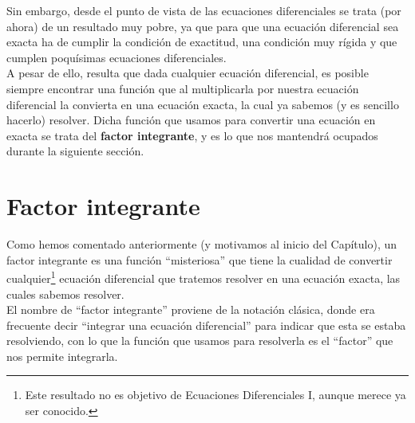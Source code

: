 Sin embargo, desde el punto de vista de las ecuaciones diferenciales se trata (por ahora) de un resultado muy pobre, ya que para que una ecuación diferencial sea exacta ha de cumplir la condición de exactitud, una condición muy rígida y que cumplen poquísimas ecuaciones diferenciales.\\

A pesar de ello, resulta que dada cualquier ecuación diferencial, es posible siempre encontrar una función que al multiplicarla por nuestra ecuación diferencial la convierta en una ecuación exacta, la cual ya sabemos (y es sencillo hacerlo) resolver. Dicha función que usamos para convertir una ecuación en exacta se trata del \textbf{factor integrante}, y es lo que nos mantendrá ocupados durante la siguiente sección.

\section{Factor integrante}
Como hemos comentado anteriormente (y motivamos al inicio del Capítulo), un factor integrante es una función ``misteriosa'' que tiene la cualidad de convertir cualquier\footnote{Este resultado no es objetivo de Ecuaciones Diferenciales I, aunque merece ya ser conocido.} ecuación diferencial que tratemos resolver en una ecuación exacta, las cuales sabemos resolver.\\

El nombre de ``factor integrante'' proviene de la notación clásica, donde era frecuente decir ``integrar una ecuación diferencial'' para indicar que esta se estaba resolviendo, con lo que la función que usamos para resolverla es el ``factor'' que nos permite integrarla.\\

